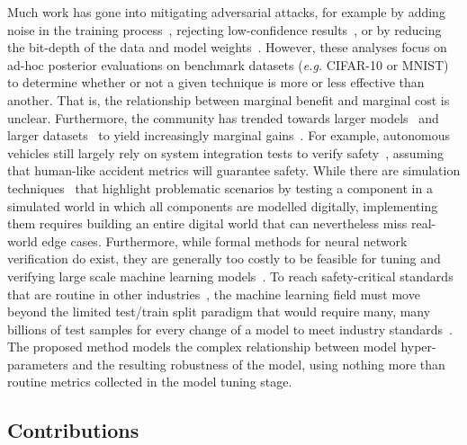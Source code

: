 Much work has gone into mitigating adversarial attacks, for example by adding noise in the training process~\cite{gauss_aug,gauss_out}, rejecting low-confidence results~\cite{high_conf}, or by reducing the bit-depth of the data and model weights~\cite{feature_squeezing}. However, these analyses focus on ad-hoc posterior evaluations on benchmark datasets (\textit{e.g.} CIFAR-10 or MNIST) to determine whether or not a given technique is more or less effective than another. That is, the relationship between marginal benefit and marginal cost is unclear. Furthermore, the community has trended towards larger models~\cite{desislavov2021compute} and larger datasets~\cite{desislavov2021compute,bailly2022effects} to yield increasingly marginal gains~\cite{sun2017revisiting}. For example, autonomous vehicles still largely rely on system integration tests to verify safety~\cite{vehicle_testing_review}, assuming that human-like accident metrics will guarantee safety. While there are simulation techniques~\cite{vehicle_formal} that highlight problematic scenarios by testing a component in a simulated world in which all components are modelled digitally, implementing them requires building an entire digital world that can nevertheless miss real-world edge cases. Furthermore, while formal methods for neural network verification do exist, they are generally too costly to be feasible for tuning and verifying large scale machine learning models~\cite{formal_adversarial}. 
To reach safety-critical standards that are routine in other industries~\cite{iso26262,IEC61508,IEC62034}, the machine learning field must move beyond the limited test/train split paradigm that would require many, many billions of test samples for every change of a model to meet industry standards~\cite{meyers}.
The proposed method models the complex relationship between model hyper-parameters and the resulting robustness of the model, using nothing more than routine metrics collected in the model tuning stage.

\subsection{Contributions}

